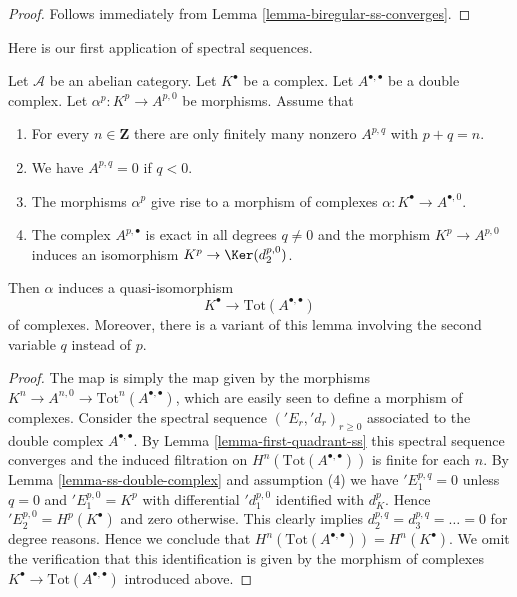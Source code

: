 \begin{proof}
Follows immediately from Lemma \ref{lemma-biregular-ss-converges}.
\end{proof}

\noindent
Here is our first application of spectral sequences.

\begin{lemma}
\label{lemma-double-complex-gives-resolution}
Let $\mathcal{A}$ be an abelian category.
Let $K^\bullet$ be a complex.
Let $A^{\bullet, \bullet}$ be a double complex.
Let $\alpha^p : K^p \to A^{p, 0}$ be morphisms.
Assume that
\begin{enumerate}
\item For every $n \in \mathbf{Z}$ there are only finitely many nonzero
$A^{p, q}$ with $p + q = n$.
\item We have $A^{p, q} = 0$ if $q < 0$.
\item The morphisms $\alpha^p$ give rise to a morphism
of complexes $\alpha : K^\bullet \to A^{\bullet, 0}$.
\item The complex $A^{p, \bullet}$ is exact in all degrees
$q \not = 0$ and the morphism $K^p \to A^{p, 0}$ induces
an isomorphism $K^p \to \Ker(d_2^{p, 0})$.
\end{enumerate}
Then $\alpha$ induces a quasi-isomorphism
$$
K^\bullet \longrightarrow \text{Tot}(A^{\bullet, \bullet})
$$
of complexes.
Moreover, there is a variant of this lemma involving the second
variable $q$ instead of $p$.
\end{lemma}

\begin{proof}
The map is simply the map given by the morphisms
$K^n \to A^{n, 0} \to \text{Tot}^n(A^{\bullet, \bullet})$,
which are easily seen to define a morphism of complexes.
Consider the spectral sequence $({}'E_r, {}'d_r)_{r \geq 0}$
associated to the double complex $A^{\bullet, \bullet}$.
By Lemma \ref{lemma-first-quadrant-ss} this spectral sequence converges
and the induced filtration on $H^n(\text{Tot}(A^{\bullet, \bullet}))$
is finite for each $n$.
By Lemma \ref{lemma-ss-double-complex} and assumption (4) we have
${}'E_1^{p, q} = 0$ unless $q = 0$ and $'E_1^{p, 0} = K^p$
with differential ${}'d_1^{p, 0}$ identified with $d_K^p$.
Hence ${}'E_2^{p, 0} = H^p(K^\bullet)$ and zero otherwise.
This clearly implies $d_2^{p, q} = d_3^{p, q} = \ldots = 0$
for degree reasons. Hence we conclude that
$H^n(\text{Tot}(A^{\bullet, \bullet})) = H^n(K^\bullet)$.
We omit the verification that this identification is given by the
morphism of complexes $K^\bullet \to \text{Tot}(A^{\bullet, \bullet})$
introduced above.
\end{proof}

